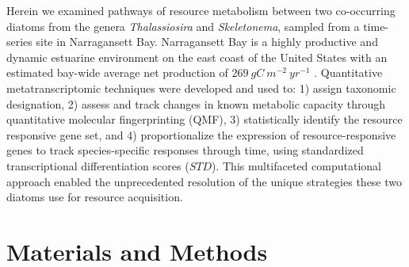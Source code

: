 Herein we examined pathways of resource metabolism between two co-occurring diatoms from the genera \textit{Thalassiosira} and \textit{Skeletonema}, sampled from a time-series site in Narragansett Bay. Narragansett Bay is a highly productive and dynamic estuarine environment on the east coast of the United States with an estimated bay-wide average net production of $269\ gC\ m^{-2}\ yr^{-1}$ \citep{Oviatt1981}. Quantitative metatranscriptomic techniques were developed and used to: 1) assign taxonomic designation, 2) assess and track changes in known metabolic capacity through quantitative molecular fingerprinting (QMF), 3) statistically identify the resource responsive gene set, and 4) proportionalize the expression of resource-responsive genes to track species-specific responses through time, using standardized transcriptional differentiation scores ($STD$). This multifaceted computational approach enabled the unprecedented resolution of the unique strategies these two diatoms use for resource acquisition. \par
\section{Materials and Methods}
